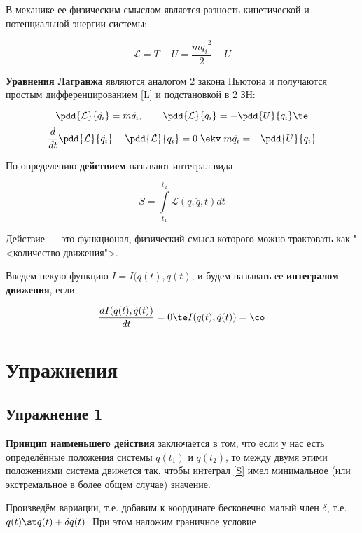 \documentclass[12pt]{kiarticle}
\newcommand{\Ll}{\ensuremath{\mathcal{L}}}
\begin{document}
В механике ее физическим смыслом является разность кинетической и потенциальной энергии системы: 

\begin{equation}\label{L}
\Ll = T - U = \dfrac{m\dot{q_i}^2}{2} - U
\end{equation}

\textbf{Уравнения Лагранжа} являются аналогом 2 закона Ньютона и получаются простым дифференцированием \eqref{L} и подстановкой в 2 ЗН:

\[ 
\pdd{\Ll}{\dot{q_i}} = m\dot{q_i}, \qquad \pdd{\Ll}{q_i} = - \pdd{U}{q_i} \te
 \]
 \begin{equation}\label{E-L}
 \dfrac{d}{dt} \pdd{\Ll}{\dot{q_i}} - \pdd{\Ll}{q_i} = 0 \; \ekv \; m\ddot{q_i} = - \pdd{U}{q_i}
 \end{equation}

По определению \textbf{действием} называют интеграл вида 

\begin{equation}\label{S}
S = \int\limits_{t_1}^{t_2} \Ll(q, \dot{q}, t) dt
\end{equation}

Действие --- это функционал, физический смысл которого можно трактовать как "<количество движения">. 

Введем некую функцию $ I = I (q(t), \dot{q}(t) $, и будем называть ее \textbf{интегралом движения}, если 

\begin{equation}\label{I}
\dfrac{d I (q(t), \dot{q}(t) )}{dt} = 0 \te I (q(t), \dot{q}(t) ) = \co 
\end{equation}



\section{Упражнения}

\subsection{Упражнение 1}

\textbf{Принцип наименьшего действия} заключается в том, что если у нас есть определённые положения системы $ q(t_1) $ и $ q(t_2) $, то между двумя этими положениями система движется так, чтобы интеграл \eqref{S} имел минимальное (или экстремальное в более общем случае) значение. 

Произведём вариации, т.е. добавим к координате бесконечно малый член $ \delta $, т.е. $ q(t) \st q(t) + \delta q(t) $. При этом наложим граничное условие 
\end{document}
